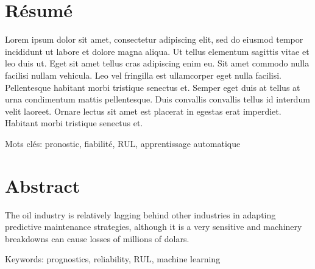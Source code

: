 \chapter*{Résumé}
\vspace{-2cm}
Lorem ipsum dolor sit amet, consectetur adipiscing elit, sed do eiusmod tempor incididunt ut labore et dolore magna aliqua. Ut tellus elementum sagittis vitae et leo duis ut. Eget sit amet tellus cras adipiscing enim eu. Sit amet commodo nulla facilisi nullam vehicula. Leo vel fringilla est ullamcorper eget nulla facilisi. Pellentesque habitant morbi tristique senectus et. Semper eget duis at tellus at urna condimentum mattis pellentesque. Duis convallis convallis tellus id interdum velit laoreet. Ornare lectus sit amet est placerat in egestas erat imperdiet. Habitant morbi tristique senectus et. 


Mots clés: pronostic, fiabilité, RUL, apprentissage automatique

{\let\clearpage\relax\chapter*{Abstract}}
\vspace{-2cm}
The oil industry is relatively lagging behind other industries in adapting predictive maintenance strategies, although it is a very sensitive and machinery breakdowns can cause losses of millions of dolars. 

Keywords: prognostics, reliability, RUL, machine learning